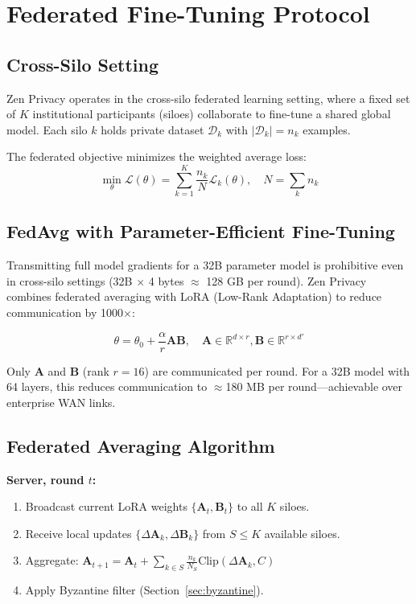 \documentclass[11pt,a4paper]{article}
\begin{document}
\section{Federated Fine-Tuning Protocol}

\subsection{Cross-Silo Setting}

Zen Privacy operates in the cross-silo federated learning setting, where a fixed set of $K$ institutional participants (siloes) collaborate to fine-tune a shared global model. Each silo $k$ holds private dataset $\mathcal{D}_k$ with $|\mathcal{D}_k| = n_k$ examples.

The federated objective minimizes the weighted average loss:
\begin{equation}
\min_\theta \mathcal{L}(\theta) = \sum_{k=1}^K \frac{n_k}{N} \mathcal{L}_k(\theta), \quad N = \sum_k n_k
\end{equation}

\subsection{FedAvg with Parameter-Efficient Fine-Tuning}

Transmitting full model gradients for a 32B parameter model is prohibitive even in cross-silo settings (32B $\times$ 4 bytes $\approx$ 128 GB per round). Zen Privacy combines federated averaging with LoRA (Low-Rank Adaptation) to reduce communication by 1000$\times$:

\begin{equation}
\theta = \theta_0 + \frac{\alpha}{r} \mathbf{A}\mathbf{B}, \quad \mathbf{A} \in \mathbb{R}^{d \times r}, \mathbf{B} \in \mathbb{R}^{r \times d'}
\end{equation}

Only $\mathbf{A}$ and $\mathbf{B}$ (rank $r=16$) are communicated per round. For a 32B model with 64 layers, this reduces communication to $\approx$180 MB per round—achievable over enterprise WAN links.

\subsection{Federated Averaging Algorithm}

\textbf{Server, round $t$:}
\begin{enumerate}
  \item Broadcast current LoRA weights $\{\mathbf{A}_t, \mathbf{B}_t\}$ to all $K$ siloes.
  \item Receive local updates $\{\Delta\mathbf{A}_k, \Delta\mathbf{B}_k\}$ from $S \leq K$ available siloes.
  \item Aggregate: $\mathbf{A}_{t+1} = \mathbf{A}_t + \sum_{k \in S} \frac{n_k}{N_S} \text{Clip}(\Delta\mathbf{A}_k, C)$
  \item Apply Byzantine filter (Section~\ref{sec:byzantine}).
\end{enumerate}
\end{document}
